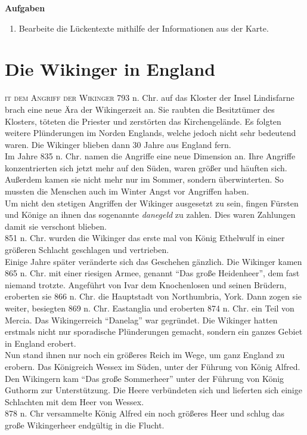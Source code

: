 \documentclass[12pt,a4paper,ngerman,openany]{book}
\newcommand{\flettrine}[2]{\lettrine[lines=2, depth=0, loversize=0.25, nindent=0.69pt, lraise=0.15]{\initfamily{#1}}{#2}}
\newcommand*\initfamily{\usefont{U}{GotIn}{xl}{n}}
\newcommand{\aufgaben}[1]{
  \begin{tcolorbox}
    \textbf{Aufgaben}
    \begin{enumerate}
      #1
    \end{enumerate}
  \end{tcolorbox}
} %
\begin{document}
\aufgaben{
  \item Bearbeite die Lückentexte mithilfe der Informationen aus der Karte.
}

\section{Die Wikinger in England}
\flettrine{M}{it dem Angriff der Wikinger} 793 n. Chr. auf das Kloster der Insel Lindisfarne brach eine neue Ära der Wikingerzeit an. Sie raubten die Besitztümer des Klosters, töteten die Priester und zerstörten das Kirchengelände. Es folgten weitere Plünderungen im Norden Englands, welche jedoch nicht sehr bedeutend waren. Die Wikinger blieben dann 30 Jahre aus England fern. \\
Im Jahre 835 n. Chr. namen die Angriffe eine neue Dimension an. Ihre Angriffe konzentrierten sich jetzt mehr auf den Süden, waren größer und häuften sich. Außerdem kamen sie nicht mehr nur im Sommer, sondern überwinterten. So mussten die Menschen auch im Winter Angst vor Angriffen haben. \\
Um nicht den stetigen Angriffen der Wikinger ausgesetzt zu sein, fingen Fürsten und Könige an ihnen das sogenannte \textit{danegeld} zu zahlen. Dies waren Zahlungen damit sie verschont blieben. \\
851 n. Chr. wurden die Wikinger das erste mal von König Ethelwulf in einer größeren Schlacht geschlagen und vertrieben.\\
Einige Jahre später veränderte sich das Geschehen gänzlich. Die Wikinger kamen 865 n. Chr. mit einer riesigen Armee, genannt “Das große Heidenheer”, dem fast niemand trotzte. Angeführt von Ivar dem Knochenlosen und seinen Brüdern, eroberten sie 866 n. Chr. die Hauptstadt von Northumbria, York. Dann zogen sie weiter, besiegten 869 n. Chr. Eastanglia und eroberten 874 n. Chr. ein Teil von Mercia. Das Wikingerreich “Danelag” war gegründet. Die Wikinger hatten erstmals nicht nur sporadische Plünderungen gemacht, sondern ein ganzes Gebiet in England erobert. \\
Nun stand ihnen nur noch ein größeres Reich im Wege, um ganz England zu erobern. Das Königreich Wessex im Süden, unter der Führung von König Alfred. Den Wikingern kam “Das große Sommerheer” unter der Führung von König Guthorm zur Unterstützung. Die Heere verbündeten sich und lieferten sich einige Schlachten mit dem Heer von Wessex. \\
878 n. Chr versammelte König Alfred ein noch größeres Heer und schlug das große Wikingerheer endgültig in die Flucht.
\end{document}
